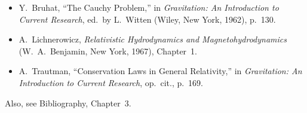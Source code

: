 

\begin{itemize}
  \item Y.~Bruhat, ``The Cauchy Problem,'' in \textit{Gravitation: An
  Introduction to Current Research}, ed.\ by L.~Witten (Wiley, New York,
  1962), p.~130.

  \item A.~Lichnerowicz, \textit{Relativistic Hydrodynamics and
  Magnetohydrodynamics} (W.~A.~Benjamin, New York, 1967), Chapter~1.

  \item A.~Trautman, ``Conservation Laws in General Relativity,'' in
  \textit{Gravitation: An Introduction to Current Research}, op.\ cit.,
  p.~169.
\end{itemize}

Also, see Bibliography, Chapter~3.



